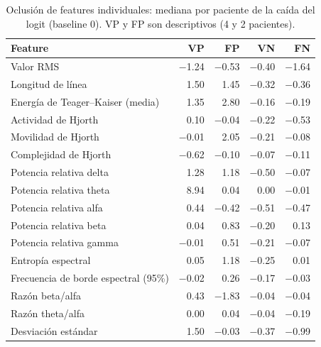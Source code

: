 \begin{table}[htbp]
\centering
\small
\caption{Oclusión de features individuales: mediana por paciente de la caída del logit (baseline 0). VP y FP son descriptivos (4 y 2 pacientes).}
\label{tab:feat_med}
\begin{tabular}{lrrrr}
\toprule
Feature & VP & FP & VN & FN \\
\midrule
Valor RMS & $-$1.24 & $-$0.53 & $-$0.40 & $-$1.64 \\
Longitud de línea & 1.50 & 1.45 & $-$0.32 & $-$0.36 \\
Energía de Teager--Kaiser (media) & 1.35 & 2.80 & $-$0.16 & $-$0.19 \\
Actividad de Hjorth & 0.10 & $-$0.04 & $-$0.22 & $-$0.53 \\
Movilidad de Hjorth & $-$0.01 & 2.05 & $-$0.21 & $-$0.08 \\
Complejidad de Hjorth & $-$0.62 & $-$0.10 & $-$0.07 & $-$0.11 \\
Potencia relativa delta & 1.28 & 1.18 & $-$0.50 & $-$0.07 \\
Potencia relativa theta & 8.94 & 0.04 & 0.00 & $-$0.01 \\
Potencia relativa alfa & 0.44 & $-$0.42 & $-$0.51 & $-$0.47 \\
Potencia relativa beta & 0.04 & 0.83 & $-$0.20 & 0.13 \\
Potencia relativa gamma & $-$0.01 & 0.51 & $-$0.21 & $-$0.07 \\
Entropía espectral & 0.05 & 1.18 & $-$0.25 & 0.01 \\
Frecuencia de borde espectral (95\%) & $-$0.02 & 0.26 & $-$0.17 & $-$0.03 \\
Razón beta/alfa & 0.43 & $-$1.83 & $-$0.04 & $-$0.04 \\
Razón theta/alfa & 0.00 & 0.04 & $-$0.04 & $-$0.19 \\
Desviación estándar & 1.50 & $-$0.03 & $-$0.37 & $-$0.99 \\
\bottomrule
\end{tabular}
\end{table}

